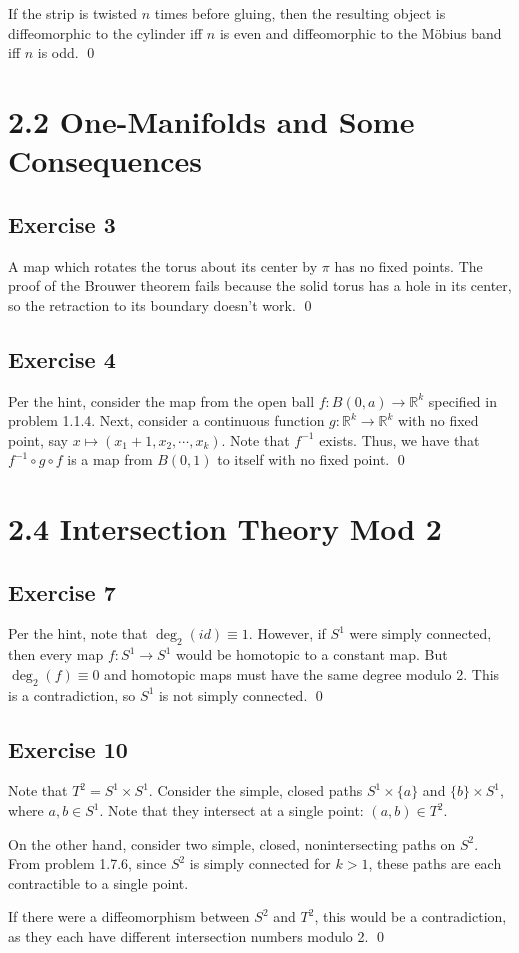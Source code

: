 \documentclass{article}
\newcommand{\R}{\mathbb{R}}
\begin{document}
    If the strip is twisted $n$ times before gluing, then the resulting object
    is diffeomorphic to the cylinder iff $n$ is even and diffeomorphic to the
    Möbius band iff $n$ is odd.
    \qed

\section*{2.2 One-Manifolds and Some Consequences}
  \subsection*{Exercise 3}
    A map which rotates the torus about its center by $\pi$ has no fixed points.
    The proof of the Brouwer theorem fails because the solid torus has a hole in
    its center, so the retraction to its boundary doesn't work.
    \qed

  \subsection*{Exercise 4}
    Per the hint, consider the map from the open ball $f\colon B(0,a)\to\R^k$
    specified in problem 1.1.4. Next, consider a continuous function $g\colon
    \R^k\to\R^k$ with no fixed point, say $x\mapsto (x_1+1,x_2,\cdots,x_k)$.
    Note that $f^{-1}$ exists. Thus, we have that $f^{-1}\circ g\circ f$ is a
    map from $B(0,1)$ to itself with no fixed point.
    \qed

\section*{2.4 Intersection Theory Mod 2}
  \subsection*{Exercise 7}
    Per the hint, note that $\deg_2(id)\equiv1$. However, if $S^1$ were simply
    connected, then every map $f\colon S^1\to S^1$ would be homotopic to a
    constant map. But $\deg_2(f)\equiv0$ and homotopic maps must have the same
    degree modulo 2. This is a contradiction, so $S^1$ is not simply connected.
    \qed

  \subsection*{Exercise 10}
    Note that $T^2=S^1\times S^1$. Consider the simple, closed paths $S^1\times
    \{a\}$ and $\{b\}\times S^1$, where $a,b\in S^1$. Note that they intersect
    at a single point: $(a,b)\in T^2$.

    On the other hand, consider two simple, closed, nonintersecting paths on
    $S^2$. From problem 1.7.6, since $S^2$ is simply connected for $k>1$, these
    paths are each contractible to a single point.

    If there were a diffeomorphism between $S^2$ and $T^2$, this would be a
    contradiction, as they each have different intersection numbers modulo 2.
    \qed
\end{document}
